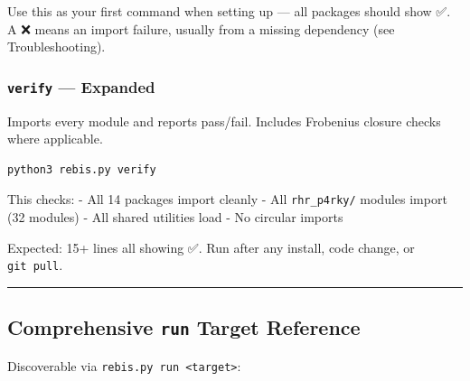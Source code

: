 \documentclass[12pt,a4paper]{article}
\begin{document}
Use this as your first command when setting up --- all packages should
show ✅. A ❌ means an import failure, usually from a missing dependency
(see Troubleshooting).

\hypertarget{verify-expanded}{%
\subsubsection{\texorpdfstring{\texttt{verify} ---
Expanded}{verify --- Expanded}}\label{verify-expanded}}

Imports every module and reports pass/fail. Includes Frobenius closure
checks where applicable.

\begin{verbatim}
python3 rebis.py verify
\end{verbatim}

This checks: - All 14 packages import cleanly - All \texttt{rhr\_p4rky/}
modules import (32 modules) - All shared utilities load - No circular
imports

Expected: 15+ lines all showing ✅. Run after any install, code change,
or \texttt{git\ pull}.

\begin{center}\rule{0.5\linewidth}{0.5pt}\end{center}

\hypertarget{comprehensive-run-target-reference}{%
\subsection{\texorpdfstring{Comprehensive \texttt{run} Target
Reference}{Comprehensive run Target Reference}}\label{comprehensive-run-target-reference}}

Discoverable via
\texttt{rebis.py\ run\ \textless{}target\textgreater{}}:
\end{document}
